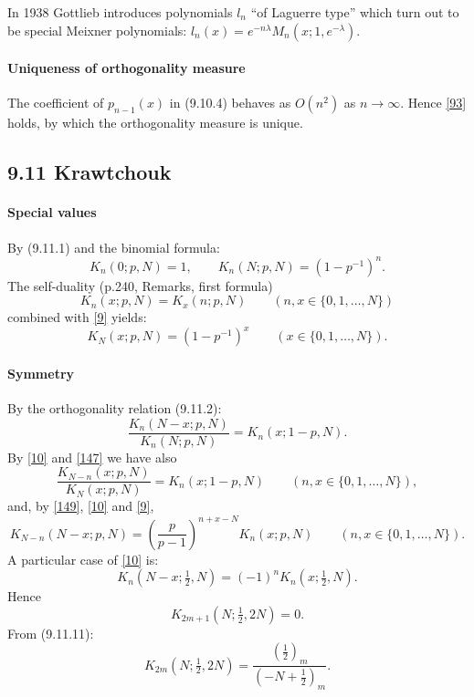 \documentclass[twoside,11pt]{article}
\newcommand\la\lambda
\newcommand\thalf{\tfrac12}
\newcommand\iy\infty
\begin{document}
In 1938 Gottlieb \cite[\S2]{K1} introduces polynomials $l_n$ ``of Laguerre type''
which turn out to be special Meixner polynomials:
$l_n(x)=e^{-n\la} M_n(x;1,e^{-\la})$.
%
\paragraph{Uniqueness of orthogonality measure}
The coefficient of $p_{n-1}(x)$ in (9.10.4) behaves as $O(n^2)$ as $n\to\iy$.
Hence \eqref{93} holds, by which the orthogonality measure is unique.
%
\subsection*{9.11 Krawtchouk}
\label{sec9.11}
%
\paragraph{Special values}
By (9.11.1) and the binomial formula:
\begin{equation}
K_n(0;p,N)=1,\qquad
K_n(N;p,N)=(1-p^{-1})^n.
\label{9}
\end{equation}
The self-duality (p.240, Remarks, first formula)
\begin{equation}
K_n(x;p,N)=K_x(n;p,N)\qquad (n,x\in \{0,1,\ldots,N\})
\label{147}
\end{equation}
combined with \eqref{9} yields:
\begin{equation}
K_N(x;p,N)=(1-p^{-1})^x\qquad(x\in\{0,1,\ldots,N\}).
\label{148}
\end{equation}
%
\paragraph{Symmetry}
By the orthogonality relation (9.11.2):
\begin{equation}
\frac{K_n(N-x;p,N)}{K_n(N;p,N)}=K_n(x;1-p,N).
\label{10}
\end{equation}
By \eqref{10} and \eqref{147} we have also
\begin{equation}
\frac{K_{N-n}(x;p,N)}{K_N(x;p,N)}=K_n(x;1-p,N)
\qquad(n,x\in\{0,1,\ldots,N\}),
\label{149}
\end{equation}
and, by \eqref{149}, \eqref{10} and \eqref{9},
\begin{equation}
K_{N-n}(N-x;p,N)=\left(\frac p{p-1}\right)^{n+x-N}K_n(x;p,N)
\qquad(n,x\in\{0,1,\ldots,N\}).
\label{150}
\end{equation}
A particular case of \eqref{10} is:
\begin{equation}
K_n(N-x;\thalf,N)=(-1)^n K_n(x;\thalf,N).
\label{11}
\end{equation}
Hence
\begin{equation}
K_{2m+1}(N;\thalf,2N)=0.
\label{12}
\end{equation}
From (9.11.11):
\begin{equation}
K_{2m}(N;\thalf,2N)=\frac{(\thalf)_m}{(-N+\thalf)_m} .
\label{13}
\end{equation}
%
\end{document}
